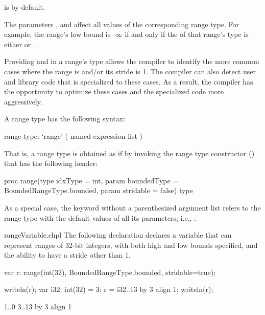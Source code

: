 \noindent {} is  by default.

The parameters ,  and 
affect all values of the corresponding range type.
For example, the range's low bound is -$\infty$ if and only if
the  of that range's type is either 
or .

\begin{rationale}
Providing  and  in a range's type
allows the compiler to identify the more common cases
where the range is  and/or its stride is 1.
The compiler can also detect user and library code that is
specialized to these cases.
As a result, the compiler has the opportunity to optimize these
cases and the specialized code more aggressively.
\end{rationale}


A range type has the following syntax:
\begin{syntax}
range-type:
  `range' ( named-expression-list )
\end{syntax}

That is, a range type is obtained as if by invoking the range type constructor
() that has the following header:

\begin{chapel}
  proc range(type idxType = int,
             param boundedType = BoundedRangeType.bounded,
             param stridable = false) type
\end{chapel}

As a special case, the keyword  without a parenthesized
argument list refers to the range type with the default values
of all its parameters, i.e.,
.

\begin{chapelexample}{rangeVariable.chpl}
The following declaration declares a variable 
that can represent ranges of 32-bit integers,
with both high and low bounds specified,
and the ability to have a stride other than 1.
\begin{chapel}
var r: range(int(32), BoundedRangeType.bounded, stridable=true);
\end{chapel}
\begin{chapelpost}
writeln(r);
var i32: int(32) = 3;
r = i32..13 by 3 align 1;
writeln(r);
\end{chapelpost}
\begin{chapeloutput}
1..0
3..13 by 3 align 1
\end{chapeloutput}
\end{chapelexample}


